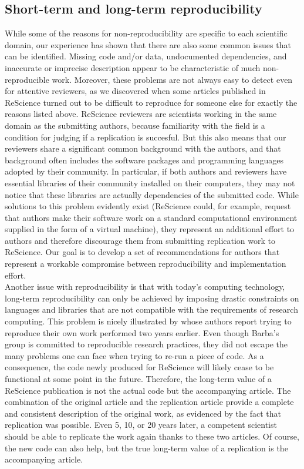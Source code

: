 \documentclass[a4paper,10pt, twocolumn]{article}
\begin{document}
\subsection*{Short-term and long-term reproducibility}

While some of the reasons for non-reproducibility are specific to each
scientific domain, our experience has shown that there are also some
common issues that can be identified.  Missing code and/or data,
undocumented dependencies, and inaccurate or imprecise description
appear to be characteristic of much non-reproducible work. Moreover,
these problems are not always easy to detect even for attentive
reviewers, as we discovered when some articles published in ReScience
turned out to be difficult to reproduce for someone else for exactly
the reasons listed above. ReScience reviewers are scientists working
in the same domain as the submitting authors, because familiarity with
the field is a condition for judging if a replication is
succesful. But this also means that our reviewers share a significant
common background with the authors, and that background often includes the
software packages and programming languages adopted by their
community.  In particular, if both authors and reviewers have
essential libraries of their community installed on their computers,
they may not notice that these libraries are actually dependencies of
the submitted code.  While solutions to this problem evidently exist
(ReScience could, for example, request that authors make their
software work on a standard computational environment supplied in the
form of a virtual machine), they represent an additional effort to
authors and therefore discourage them from submitting replication work to
ReScience.  Our goal is to develop a set of recommendations for
authors that represent a workable compromise between reproducibility
and implementation effort.\\

Another issue with reproducibility is that with today's computing
technology, long-term reproducibility can only be achieved by imposing
drastic constraints on languages and libraries that are not compatible
with the requirements of research computing. This problem is nicely
illustrated by \citet{Mesnard:2016} whose authors report trying to
reproduce their own work performed two years earlier. Even though
Barba's group is committed to reproducible research practices, they
did not escape the many problems one can face when trying to re-run a
piece of code. As a consequence, the code newly produced for ReScience
will likely cease to be functional at some point in the future.
Therefore, the long-term value of a ReScience publication is not the
actual code but the accompanying article. The combination of the
original article and the replication article provide a complete and
consistent description of the original work, as evidenced by the fact
that replication was possible. Even 5, 10, or 20 years later, a
competent scientist should be able to replicate the work again thanks
to these two articles. Of course, the new code can also help, but the
true long-term value of a replication is the accompanying article.\\
\end{document}
